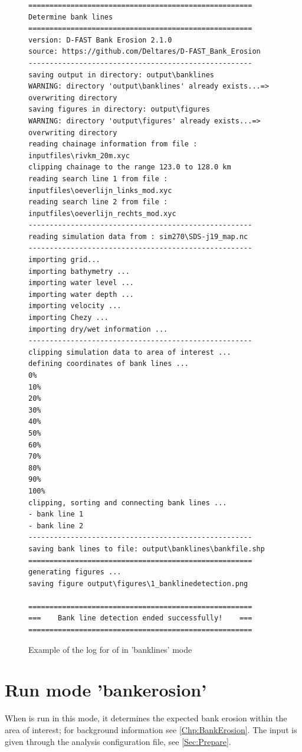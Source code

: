 \pagebreak 

\begin{figure}[!ht]
\begin{Verbatim}
=====================================================
Determine bank lines
=====================================================
version: D-FAST Bank Erosion 2.1.0
source: https://github.com/Deltares/D-FAST_Bank_Erosion
-----------------------------------------------------
saving output in directory: output\banklines
WARNING: directory 'output\banklines' already exists...=> overwriting directory
saving figures in directory: output\figures
WARNING: directory 'output\figures' already exists...=> overwriting directory
reading chainage information from file : inputfiles\rivkm_20m.xyc
clipping chainage to the range 123.0 to 128.0 km
reading search line 1 from file : inputfiles\oeverlijn_links_mod.xyc
reading search line 2 from file : inputfiles\oeverlijn_rechts_mod.xyc
-----------------------------------------------------
reading simulation data from : sim270\SDS-j19_map.nc
-----------------------------------------------------
importing grid...
importing bathymetry ...
importing water level ...
importing water depth ...
importing velocity ...
importing Chezy ...
importing dry/wet information ...
-----------------------------------------------------
clipping simulation data to area of interest ...
defining coordinates of bank lines ...
0%
10%
20%
30%
40%
50%
60%
70%
80%
90%
100%
clipping, sorting and connecting bank lines ...
- bank line 1
- bank line 2
-----------------------------------------------------
saving bank lines to file: output\banklines\bankfile.shp
=====================================================
generating figures ...
saving figure output\figures\1_banklinedetection.png

=====================================================
===    Bank line detection ended successfully!    ===
=====================================================
\end{Verbatim}
\caption{Example of the log for of \dfastbe in 'banklines' mode}
\label{logbanklines}
\end{figure}

\pagebreak 

\section{Run mode 'bankerosion'} \label{Sec:runerosion}

When \dfastbe is run in this mode, it determines the expected bank erosion within the area of interest; for background information see \autoref{Chp:BankErosion}.
The input is given through the analysis configuration file, see \autoref{Sec:Prepare}.

